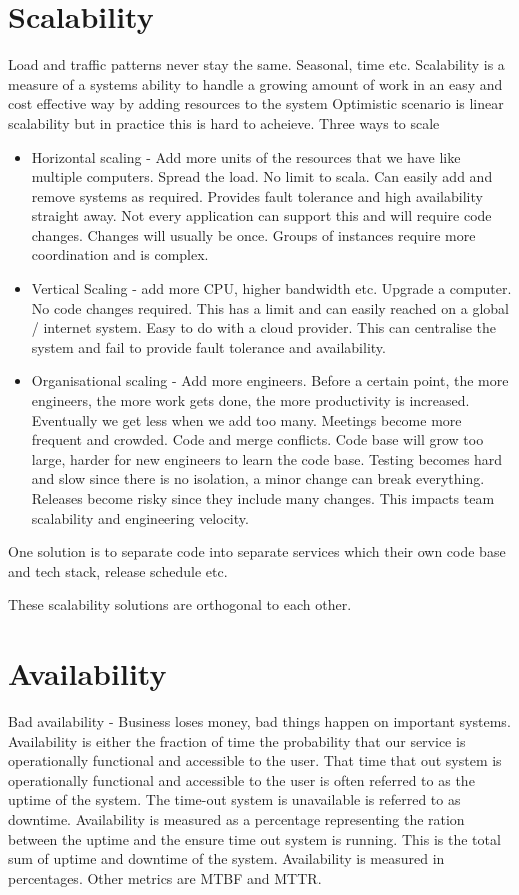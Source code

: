 \section{Scalability}
Load and traffic patterns never stay the same.
Seasonal, time etc.
Scalability is a measure of a systems ability to handle a growing amount of work in an easy and cost effective way by adding resources to the system
Optimistic scenario is linear scalability but in practice this is hard to acheieve.
Three ways to scale
\begin{itemize}
    \item Horizontal scaling - Add more units of the resources that we have like multiple computers.
    Spread the load.
    No limit to scala.
    Can easily add and remove systems as required.
    Provides fault tolerance and high availability straight away.
    Not every application can support this and will require code changes.
    Changes will usually be once.
    Groups of instances require more coordination and is complex.
    \item Vertical Scaling - add more CPU, higher bandwidth etc.
    Upgrade a computer.
    No code changes required.
    This has a limit and can easily reached on a global / internet system.
    Easy to do with a cloud provider.
    This can centralise the system and fail to provide fault tolerance and availability.
    \item Organisational scaling - Add more engineers.
    Before a certain point, the more engineers, the more work gets done, the more productivity is increased.
    Eventually we get less when we add too many.
    Meetings become more frequent and crowded.
    Code and merge conflicts.
    Code base will grow too large, harder for new engineers to learn the code base.
    Testing becomes hard and slow since there is no isolation, a minor change can break everything.
    Releases become risky since they include many changes.
    This impacts team scalability and engineering velocity.
\end{itemize}
One solution is to separate code into separate services which their own code base and tech stack, release schedule etc.

These scalability solutions are orthogonal to each other.


\section{Availability}
Bad availability - Business loses money, bad things happen on important systems.
Availability is either the fraction of time the probability that our service is operationally functional and accessible to the user.
That time that out system is operationally functional and accessible to the user is often referred to as the uptime of the system.
The time-out system is unavailable is referred to as downtime.
Availability is measured as a percentage representing the ration between the uptime and the ensure time out system is running.
This is the total sum of uptime and downtime of the system.
Availability is measured in percentages.
Other metrics are MTBF and MTTR.

